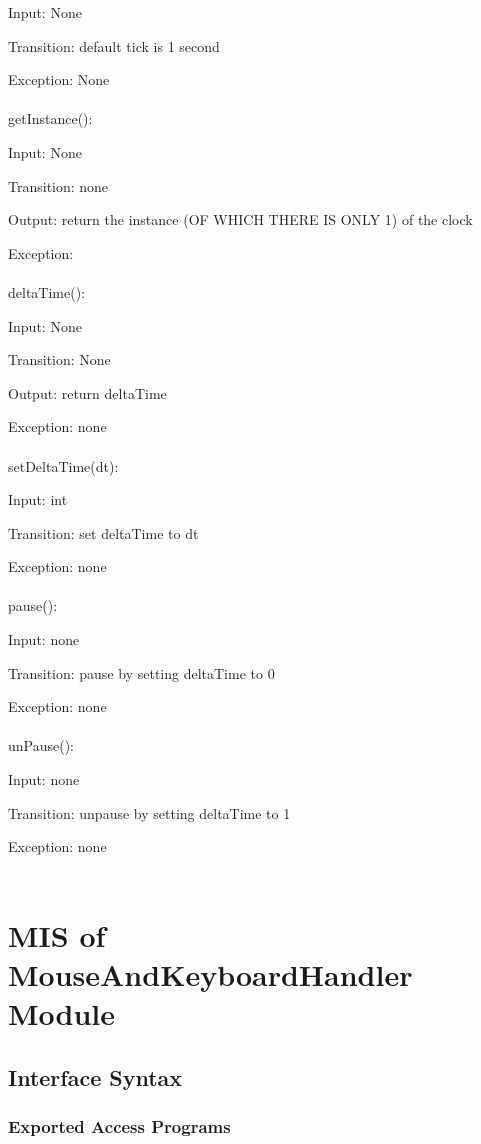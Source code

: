 \documentclass[12,english]{article}
\begin{document}
		Input: None
		
		Transition: default tick is 1 second
		
		Exception: None\\
		\\
	getInstance():
		
		Input: None
		
		Transition: none
		
		Output: return the instance (OF WHICH THERE IS ONLY 1) of the clock
		
		Exception: \\
		\\
	deltaTime():

		Input: None
		
		Transition: None
		
		Output: return deltaTime
		
		Exception: none\\
		\\
	setDeltaTime(dt):
		
		Input: int
		
		Transition: set deltaTime to dt
		
		Exception: none\\
		\\
	pause():
		
		Input: none
		
		Transition: pause by setting deltaTime to 0
		
		
		Exception: none\\
		\\
	unPause():
		
		Input: none
		
		Transition: unpause by setting deltaTime to 1

		Exception: none\\
		\\

\section{MIS of MouseAndKeyboardHandler Module}
	\subsection{Interface Syntax}
		\subsubsection{Exported Access Programs}
		
\end{document}

